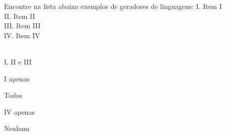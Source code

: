 \question[10]
Encontre na lista abaixo exemplos de geradores de linguagens:
I. Item I\\
II. Item II\\
III. Item III\\
IV. Item IV\\
\\
\begin{choices}
\item I, II e III
\item I apenas %
\item Todos
\item IV apenas
\item Nenhum
\end{choices}
\answerline


